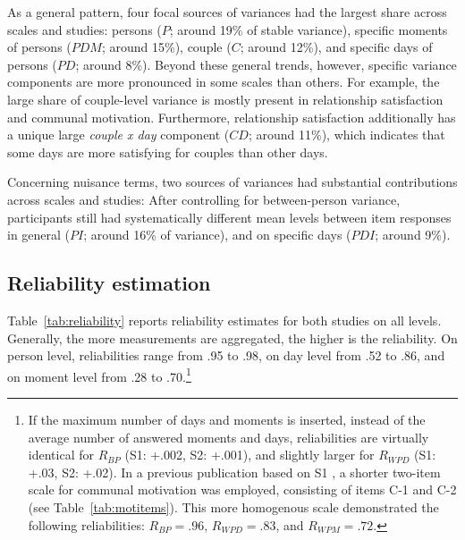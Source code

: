 \documentclass[jou,a4paper,draftfirst]{apa6}\usepackage[]{graphicx}\usepackage[]{color}
\begin{document}
As a general pattern, four focal sources of variances had the largest share across scales and studies: persons ($P$; around 19\% of stable variance), specific moments of persons ($PDM$; around 15\%), couple ($C$; around 12\%), and specific days of persons ($PD$; around 8\%). Beyond these general trends, however, specific variance components are more pronounced in some scales than others. For example, the large share of couple-level variance is mostly present in relationship satisfaction and communal motivation. Furthermore, relationship satisfaction additionally has a unique large \emph{couple x day} component ($CD$; around 11\%), which indicates that some days are more satisfying for couples than other days.

Concerning nuisance terms, two sources of variances had substantial contributions across scales and studies: After controlling for between-person variance, participants still had systematically different mean levels between item responses in general ($PI$; around 16\% of variance), and on specific days ($PDI$; around 9\%).




\subsection{Reliability estimation}

Table~\ref{tab:reliability} reports reliability estimates for both studies on all levels. Generally, the more measurements are aggregated, the higher is the reliability. On person level, reliabilities range from .95 to .98, on day level from .52 to .86, and on moment level from .28 to .70.\footnote{If the maximum number of days and moments is inserted, instead of the average number of answered moments and days, reliabilities are virtually identical for $R_{BP}$ (S1: +.002, S2: +.001), and slightly larger for $R_{WPD}$ (S1: +.03, S2: +.02). In a previous publication based on S1 \parencite{zygar_MotiveDispositionsStates_2018}, a shorter two-item scale for communal motivation was employed, consisting of items C-1 and C-2 (see Table~\ref{tab:motitems}). This more homogenous scale demonstrated the following reliabilities: $R_{BP} = .96$, $R_{WPD} = .83$, and $R_{WPM} = .72$.}
\end{document}
